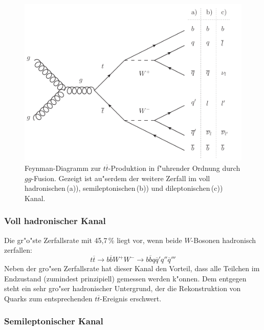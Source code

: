 \begin{figure}[ht]
	\centering
	\includegraphics[scale=0.80]{Theorie/leadingorderttproduction-eps-converted-to}
	\caption[Feynman-Diagramm zur $t\overline{t}$-Produktion in f"uhrender Ordnung durch $gg$-Fusion]{Feynman-Diagramm zur $t\overline{t}$-Produktion in f"uhrender Ordnung durch $gg$-Fusion. Gezeigt ist au"serdem der weitere Zerfall im voll hadronischen\,(a)), semi\-lep\-tonischen\,(b)) und dileptonischen\,(c)) Kanal.}
	\label{leadingorderttbar}
\end{figure}

\subsubsection*{Voll hadronischer Kanal}
Die gr"o"ste Zerfallsrate mit 45,7\,\% liegt vor, wenn beide $W$-Bosonen hadronisch zerfallen:
\begin{equation*}
t\overline{t}\rightarrow b\overline{b}W^{+}W^{-}\rightarrow b\overline{b}q\overline{q}'q''\overline{q}'''
\end{equation*}
Neben der gro"sen Zerfallsrate hat dieser Kanal den Vorteil, dass alle Teilchen im Endzustand (zumindest prinzipiell) gemessen werden k"onnen. Dem entgegen steht ein sehr gro"ser hadronischer Untergrund, der die Rekonstruktion von Quarks zum entsprechenden $t\overline{t}$-Ereignis erschwert.

\subsubsection*{Semileptonischer Kanal}

